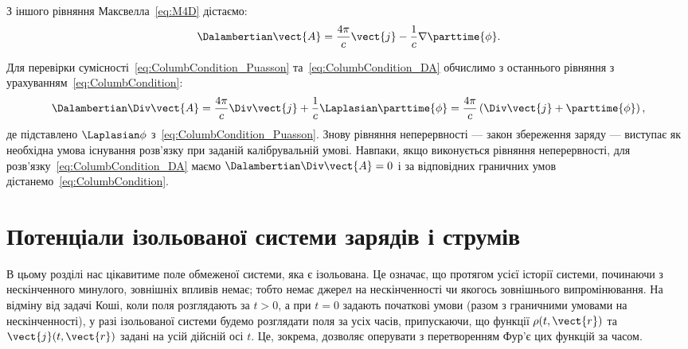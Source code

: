 З іншого рівняння Максвелла~\eqref{eq:M4D} дістаємо:
\begin{equation}\label{eq:ColumbCondition_DA}
	\Dalambertian \vect{A} = \frac{4\pi}c \vect{j} - \frac1c \nabla \parttime{\phi}.
\end{equation}

Для перевірки сумісності~\eqref{eq:ColumbCondition_Puasson} та~\eqref{eq:ColumbCondition_DA} обчислимо з останнього
рівняння з урахуванням~\eqref{eq:ColumbCondition}:
\begin{equation*}
	\Dalambertian \Div\vect{A} = \frac{4\pi}c \Div\vect{j} + \frac1c \Laplasian \parttime{\phi} = \frac{4\pi}c\left( \Div\vect{j} +
	\parttime{\phi}\right),
\end{equation*}
де підставлено $\Laplasian\phi$ з~\eqref{eq:ColumbCondition_Puasson}. Знову рівняння неперервності --- закон збереження
заряду --- виступає як необхідна умова існування розв'язку при заданій калібрувальній умові. Навпаки, якщо виконується
рівняння неперервності, для розв'язку~\eqref{eq:ColumbCondition_DA} маємо $\Dalambertian \Div\vect{A} = 0$ і за
відповідних граничних умов дістанемо~\eqref{eq:ColumbCondition}.


\section{Потенціали ізольованої системи зарядів і струмів}\label{sec:Potentials_of_isolated_system}



В цьому розділі нас цікавитиме поле обмеженої системи, яка є ізольована. Це означає, що протягом усієї історії системи,
починаючи з нескінченного минулого, зовнішніх впливів немає; тобто немає джерел на нескінченності чи якогось зовнішнього
випромінювання. На відміну від задачі Коші, коли поля розглядають за $t >0$, а при $t =0$ задають початкові умови (разом
з граничними умовами на нескінченності), у разі ізольованої системи будемо розглядати поля за усіх часів, припускаючи,
що функції $\rho(t, \vect{r})$ та $\vect{j}(t, \vect{r})$ задані на усій дійсній осі $t$. Це, зокрема, дозволяє
оперувати з перетворенням Фур'є цих функцій за часом.

